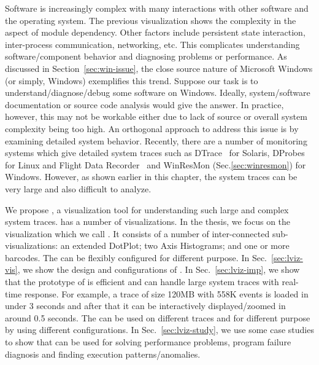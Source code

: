 
Software is increasingly complex with many interactions with other software
and the operating system.
The previous visualization shows the complexity in the
aspect of module dependency.
Other factors include persistent state interaction, inter-process communication,
networking, etc.
This complicates understanding software/component behavior and diagnosing
problems or performance.
As discussed in Section~\ref{sec:win-issue},
the close source nature of Microsoft Windows (or simply, Windows)
exemplifies this trend.
Suppose our task is to understand/diagnose/debug some software on Windows.
Ideally, system/software documentation or source code
analysis would give the answer.
In practice, however, this may not be
workable either due to lack of source or overall
system complexity being too high.
An orthogonal approach to address this issue is by examining
detailed system behavior.
Recently, there are a number of monitoring systems which
give detailed system traces such as DTrace~\cite{cantrill2004dynamic} for Solaris,
DProbes for Linux and Flight Data Recorder~\cite{verbowski6flight}
and WinResMon (Sec.\ref{sec:winresmon}) for Windows.
However, as shown earlier in this chapter,
the system traces can be very large and also
difficult to analyze.

We propose \lviz{}, a visualization tool for
understanding such large and complex system traces.
\lviz{} has a number of visualizations.
In the thesis, we focus on the visualization which we call \VDP{}.
It consists of a number of inter-connected sub-visualizations:
an extended DotPlot;
two Axis Histograms; and one or more barcodes.
The \VDP{} can be flexibly configured for different purpose.
In Sec.~\ref{sec:lviz-vis}, we show the design and configurations of \VDP{}.
In Sec.~\ref{sec:lviz-imp}, we show that
the prototype of \lviz{} is efficient and can handle large system traces
with real-time response. For example, a trace of size 120MB with 558K events 
is loaded in under 3 seconds
and after that it can be interactively displayed/zoomed in around 0.5 seconds.
The \VDP{} can be used on different traces and for different purpose
by using different configurations.
In Sec.~\ref{sec:lviz-study}, we use some case studies to show that
\VDP{} can be used for solving performance problems,
program failure diagnosis and finding execution patterns/anomalies.
